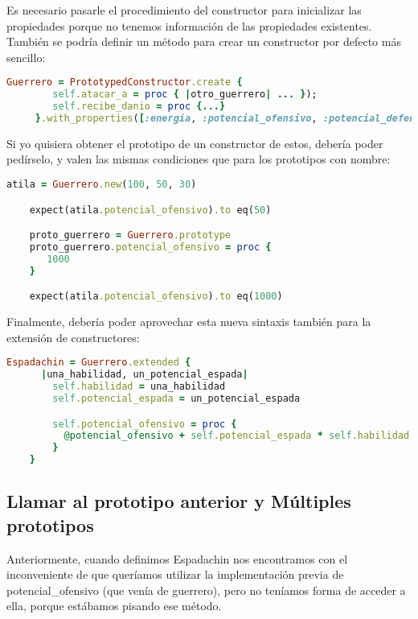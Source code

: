 \documentclass[spanish,a4paper]{article}
\begin{document}
Es necesario pasarle el procedimiento del constructor para inicializar las propiedades porque no tenemos información de las propiedades existentes. También se podría definir un método para crear un constructor por defecto más sencillo:
\begin{lstlisting}[language=Ruby]
	Guerrero = PrototypedConstructor.create {
		self.atacar_a = proc { |otro_guerrero| ... });
		self.recibe_danio = proc {...}
	 }.with_properties([:energia, :potencial_ofensivo, :potencial_defensivo])
\end{lstlisting}
Si yo quisiera obtener el prototipo de un constructor de estos, debería poder pedírselo, y valen las mismas condiciones que para los prototipos con nombre:
\begin{lstlisting}[language=Ruby]
	atila = Guerrero.new(100, 50, 30)

	expect(atila.potencial_ofensivo).to eq(50)

	proto_guerrero = Guerrero.prototype
	proto_guerrero.potencial_ofensivo = proc {
	   1000
	}

	expect(atila.potencial_ofensivo).to eq(1000)
\end{lstlisting}
\newpage
Finalmente, debería poder aprovechar esta nueva sintaxis también para la extensión de constructores:
\begin{lstlisting}[language=Ruby]
	Espadachin = Guerrero.extended {
	  |una_habilidad, un_potencial_espada|
		self.habilidad = una_habilidad
		self.potencial_espada = un_potencial_espada

		self.potencial_ofensivo = proc {
		  @potencial_ofensivo + self.potencial_espada * self.habilidad
		}
	}
\end{lstlisting}


\subsection{Llamar al prototipo anterior y Múltiples prototipos}
Anteriormente, cuando definimos Espadachin nos encontramos con el inconveniente de que queríamos utilizar la implementación previa de potencial\_ofensivo (que venía de guerrero), pero no teníamos forma de acceder a ella, porque estábamos pisando ese método.

\bigskip
\end{document}

